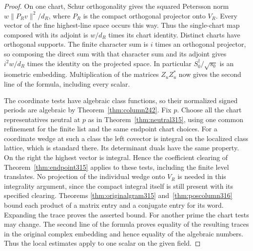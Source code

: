 \documentclass[a4paper,11pt]{article}
\theoremstyle{definition}
\theoremstyle{remark}
\numberwithin{equation}{section}
\begin{document}
\begin{proof}
On one chart, Schur orthogonality gives the squared
Petersson norm \(w\|P_Rv\|^2/d_R\), where \(P_R\) is the
compact orthogonal projector onto \(V_R\). Every vector
of the fine highest-line space occurs this way. Thus the
single-chart map composed with its adjoint is \(w/d_R\)
times its chart identity. Distinct charts have orthogonal
supports. The finite character sum is \(i\) times an
orthogonal projector, so composing the direct sum with
that character sum and its adjoint gives \(i^2 w/d_R\)
times the identity on the projected space. In particular
\(S_0^\dagger/\sqrt{s_0}\) is an isometric embedding.
Multiplication of the matrices \(Z_u Z_u^*\) now gives
the second line of the formula, including every scalar.

The coordinate tests have algebraic class functions,
so their normalized signed periods are algebraic by
Theorem~\ref{thm:column242}. Fix \(p\). Choose all the
chart representatives neutral at \(p\) as in
Theorem~\ref{thm:neutral315}, using one common refinement
for the finite list and the same endpoint chart choices.
For a coordinate wedge at such a class the left covector
is integral on the localized class lattice, which is
standard there. Its determinant duals have the same
property. On the right the highest vector is integral.
Hence the coefficient clearing of
Theorem~\ref{thm:endpoint315} applies to these tests,
including the finite level translates. No projection of
the individual wedge onto \(V_R\) is needed in this
integrality argument, since the compact integral itself
is still present with its specified clearing. Theorems
\ref{thm:originalgram315} and~\ref{thm:poscolumn316}
bound each product of a matrix entry and a conjugate
entry for its word. Expanding the trace proves the
asserted bound. For another prime the chart tests may
change. The second line of the formula proves equality
of the resulting traces in the original complex embedding
and hence equality of the algebraic numbers. Thus the
local estimates apply to one scalar on the given field.
\end{proof}
\end{document}
